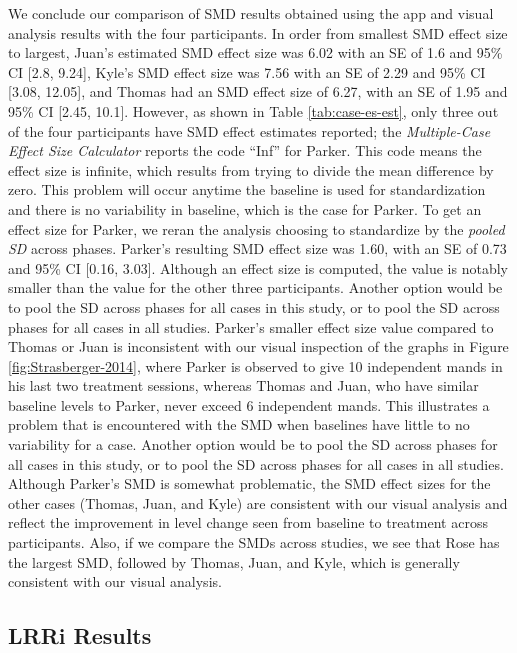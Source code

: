 \documentclass[
]{book}
\begin{document}
We conclude our comparison of SMD results obtained using the app and visual analysis results with the four \citet{StrasbergerFerreri2014} participants. In order from smallest SMD effect size to largest, Juan's estimated SMD effect size was 6.02 with an SE of 1.6 and 95\% CI {[}2.8, 9.24{]}, Kyle's SMD effect size was 7.56 with an SE of 2.29 and 95\% CI {[}3.08, 12.05{]}, and Thomas had an SMD effect size of 6.27, with an SE of 1.95 and 95\% CI {[}2.45, 10.1{]}. However, as shown in Table \ref{tab:case-es-est}, only three out of the four participants have SMD effect estimates reported; the \emph{Multiple-Case Effect Size Calculator} reports the code ``Inf'' for Parker. This code means the effect size is infinite, which results from trying to divide the mean difference by zero. This problem will occur anytime the baseline is used for standardization and there is no variability in baseline, which is the case for Parker. To get an effect size for Parker, we reran the analysis choosing to standardize by the \emph{pooled SD} across phases. Parker's resulting SMD effect size was 1.60, with an SE of 0.73 and 95\% CI {[}0.16, 3.03{]}. Although an effect size is computed, the value is notably smaller than the value for the other three participants. Another option would be to pool the SD across phases for all cases in this study, or to pool the SD across phases for all cases in all studies. Parker's smaller effect size value compared to Thomas or Juan is inconsistent with our visual inspection of the graphs in Figure \ref{fig:Strasberger-2014}, where Parker is observed to give 10 independent mands in his last two treatment sessions, whereas Thomas and Juan, who have similar baseline levels to Parker, never exceed 6 independent mands. This illustrates a problem that is encountered with the SMD when baselines have little to no variability for a case. Another option would be to pool the SD across phases for all cases in this study, or to pool the SD across phases for all cases in all studies. Although Parker's SMD is somewhat problematic, the SMD effect sizes for the other cases (Thomas, Juan, and Kyle) are consistent with our visual analysis and reflect the improvement in level change seen from baseline to treatment across participants. Also, if we compare the SMDs across studies, we see that Rose has the largest SMD, followed by Thomas, Juan, and Kyle, which is generally consistent with our visual analysis.

\hypertarget{lrri-results}{%
\subsection{LRRi Results}\label{lrri-results}}
\end{document}
